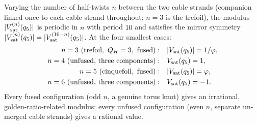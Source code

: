 \begin{proposition}
\label{P18:prop:satellite_twist_family}
Varying the number of half-twists $n$ between the two cable strands
(companion linked once to each cable strand throughout; $n=3$ is the
trefoil), the modulus $|V_{\mathrm{sat}}^{(n)}(q_5)|$ is periodic
in $n$ with period $10$ and satisfies the mirror symmetry
$|V_{\mathrm{sat}}^{(n)}(q_5)|=|V_{\mathrm{sat}}^{(10-n)}(q_5)|$.
At the four smallest cases:
\begin{align}
  n=3\ (\text{trefoil},\ Q_H=3,\ \text{fused}): &\quad
    |V_{\mathrm{sat}}(q_5)| = 1/\varphi,\\
  n=4\ (\text{unfused, three components}): &\quad
    V_{\mathrm{sat}}(q_5) = 1,\\
  n=5\ (\text{cinquefoil},\ \text{fused}): &\quad
    |V_{\mathrm{sat}}(q_5)| = \varphi,\\
  n=6\ (\text{unfused, three components}): &\quad
    V_{\mathrm{sat}}(q_5) = -1.
\end{align}
Every fused configuration (odd $n$, a genuine torus knot) gives an
irrational, golden-ratio-related modulus; every unfused configuration
(even $n$, separate un-merged cable strands) gives a rational value.
\end{proposition}

